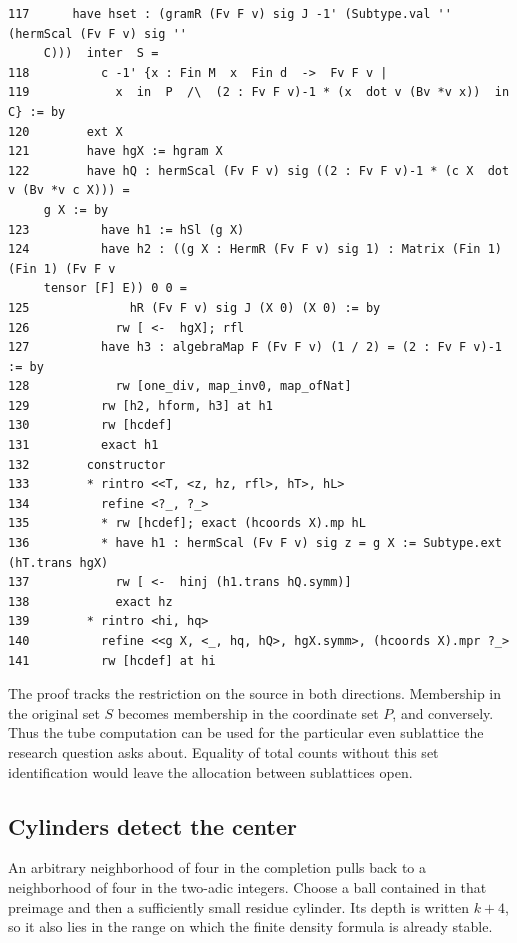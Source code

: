\documentclass[12pt,letterpaper]{article}
\begin{document}
\par
{\fontsize{9.2}{11.2}\selectfont\begin{verbatim}
117      have hset : (gramR (Fv F v) sig J -1' (Subtype.val '' (hermScal (Fv F v) sig ''
     C)))  inter  S =
118          c -1' {x : Fin M  x  Fin d  ->  Fv F v |
119            x  in  P  /\  (2 : Fv F v)-1 * (x  dot v (Bv *v x))  in  C} := by
120        ext X
121        have hgX := hgram X
122        have hQ : hermScal (Fv F v) sig ((2 : Fv F v)-1 * (c X  dot v (Bv *v c X))) =
     g X := by
123          have h1 := hSl (g X)
124          have h2 : ((g X : HermR (Fv F v) sig 1) : Matrix (Fin 1) (Fin 1) (Fv F v
     tensor [F] E)) 0 0 =
125              hR (Fv F v) sig J (X 0) (X 0) := by
126            rw [ <-  hgX]; rfl
127          have h3 : algebraMap F (Fv F v) (1 / 2) = (2 : Fv F v)-1 := by
128            rw [one_div, map_inv0, map_ofNat]
129          rw [h2, hform, h3] at h1
130          rw [hcdef]
131          exact h1
132        constructor
133        * rintro <<T, <z, hz, rfl>, hT>, hL>
134          refine <?_, ?_>
135          * rw [hcdef]; exact (hcoords X).mp hL
136          * have h1 : hermScal (Fv F v) sig z = g X := Subtype.ext (hT.trans hgX)
137            rw [ <-  hinj (h1.trans hQ.symm)]
138            exact hz
139        * rintro <hi, hq>
140          refine <<g X, <_, hq, hQ>, hgX.symm>, (hcoords X).mpr ?_>
141          rw [hcdef] at hi
\end{verbatim}}
The proof tracks the restriction on the source in both directions. Membership in the original set $S$ becomes membership in the coordinate set $P$, and conversely. Thus the tube computation can be used for the particular even sublattice the research question asks about. Equality of total counts without this set identification would leave the allocation between sublattices open.
\clearpage{}\subsection*{Cylinders detect the center}\label{extract-FourNeighborhood6}
An arbitrary neighborhood of four in the completion pulls back to a neighborhood of four in the two-adic integers. Choose a ball contained in that preimage and then a sufficiently small residue cylinder. Its depth is written $k+4$, so it also lies in the range on which the finite density formula is already stable.
\par
\end{document}
